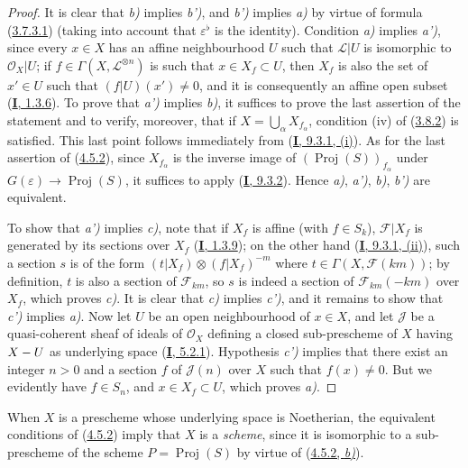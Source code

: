 \begin{proof}
It is clear that \emph{b)} implies \emph{b')}, and \emph{b')} implies \emph{a)} by virtue of formula
(\hyperref[II.3.7.3.1]{3.7.3.1}) (taking into account that
$\varepsilon^\flat$ is the identity). Condition \emph{a)} implies \emph{a')}, since every
$x\in X$ has an affine neighbourhood $U$ such that
$\mathcal{L}|U$ is isomorphic to $\mathcal{O}_X|U$; if
$f\in\Gamma(X,\mathcal{L}^{\otimes n})$ is such that $x\in X_f\subset U$,
then $X_f$ is also the set of $x'\in U$ such that $(f|U)(x')\neq0$, and it is
consequently an affine open subset (\hyperref[I.1.3.6]{\textbf{I}, 1.3.6}). To prove
that \emph{a')} implies \emph{b)}, it suffices to prove the last assertion of the statement
and to verify, moreover, that if $X=\bigcup_\alpha X_{f_\alpha}$, condition
(iv) of (\hyperref[II.3.8.2]{3.8.2}) is satisfied. This last point
follows immediately from (\hyperref[I.9.3.1]{\textbf{I}, 9.3.1, (i)}). As for the
last assertion of (\hyperref[II.4.5.2]{4.5.2}), since
$X_{f_\alpha}$ is the inverse image of
$(\operatorname{Proj}(S))_{f_\alpha}$ under
$G(\varepsilon)\to\operatorname{Proj}(S)$, it suffices to apply
(\hyperref[I.9.3.2]{\textbf{I}, 9.3.2}). Hence \emph{a)}, \emph{a')}, \emph{b)}, \emph{b')} are equivalent.

To show that \emph{a')} implies \emph{c)}, note that if $X_f$ is affine (with
$f\in S_k$), $\mathcal{F}|X_f$ is generated by its sections over
$X_f$ (\hyperref[I.1.3.9]{\textbf{I}, 1.3.9}); on the other hand
(\hyperref[I.9.3.1]{\textbf{I}, 9.3.1, (ii)}), such a section $s$ is of the form
$(t|X_f)\otimes(f|X_f)^{-m}$ where
$t\in\Gamma(X,\mathcal{F}(km))$; by definition, $t$ is also a section
of $\mathcal{F}_{km}$, so $s$ is indeed a section of
$\mathcal{F}_{km}(-km)$ over $X_f$, which proves \emph{c)}. It is clear
that \emph{c)} implies \emph{c')}, and it remains to show that \emph{c')} implies \emph{a)}. Now let $U$
be an open neighbourhood of $x\in X$, and let $\mathcal{J}$ be a quasi-coherent
sheaf of ideals of $\mathcal{O}_X$ defining a closed sub-prescheme of $X$
having $X- U$ as underlying space
(\hyperref[I.5.2.1]{\textbf{I}, 5.2.1}). Hypothesis \emph{c')} implies that there exist an
integer $n>0$ and a section $f$ of $\mathcal{J}(n)$ over $X$ such
that $f(x)\neq0$. But we evidently have $f\in S_n$, and $x\in X_f\subset U$,
which proves \emph{a)}.
\end{proof}

When $X$ is a prescheme whose underlying space is Noetherian, the
equivalent conditions of (\hyperref[II.4.5.2]{4.5.2}) imply that
$X$ is a \emph{scheme}, since it is isomorphic to a sub-prescheme of the scheme
$P=\operatorname{Proj}(S)$ by virtue of
(\hyperref[II.4.5.2]{4.5.2, \emph{b)}}).

